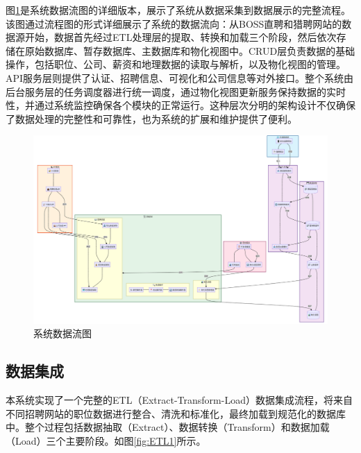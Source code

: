 图\ref{fig:system_dataflow}是系统数据流图的详细版本，展示了系统从数据采集到数据展示的完整流程。该图通过流程图的形式详细展示了系统的数据流向：从BOSS直聘和猎聘网站的数据源开始，数据首先经过ETL处理层的提取、转换和加载三个阶段，然后依次存储在原始数据库、暂存数据库、主数据库和物化视图中。CRUD层负责数据的基础操作，包括职位、公司、薪资和地理数据的读取与解析，以及物化视图的管理。API服务层则提供了认证、招聘信息、可视化和公司信息等对外接口。整个系统由后台服务层的任务调度器进行统一调度，通过物化视图更新服务保持数据的实时性，并通过系统监控确保各个模块的正常运行。这种层次分明的架构设计不仅确保了数据处理的完整性和可靠性，也为系统的扩展和维护提供了便利。

\begin{figure}[htbp]
    \centering
    \includegraphics[width=1.0\textwidth]{figures/系统数据流图.png}
    \caption{系统数据流图}
    \label{fig:system_dataflow}
\end{figure}

\subsection{数据集成}
本系统实现了一个完整的ETL（Extract-Transform-Load）数据集成流程，将来自不同招聘网站的职位数据进行整合、清洗和标准化，最终加载到规范化的数据库中。整个过程包括数据抽取（Extract）、数据转换（Transform）和数据加载（Load）三个主要阶段。如图\ref{fig:ETL1}所示。

